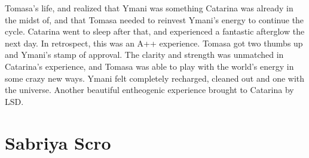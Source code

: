 \documentclass[12pt]{book}
\begin{document}
Tomasa's life, and realized that Ymani was something Catarina was already in the midst of, and that Tomasa needed to reinvest Ymani's energy to continue the cycle. Catarina went to sleep after that, and experienced a fantastic afterglow the next day. In retrospect, this was an A++ experience. Tomasa got two thumbs up and Ymani's stamp of approval. The clarity and strength was unmatched in Catarina's experience, and Tomasa was able to play with the world's energy in some crazy new ways. Ymani felt completely recharged, cleaned out and one with the universe. Another beautiful entheogenic experience brought to Catarina by LSD.



\chapter{Sabriya Scro}
\end{document}
